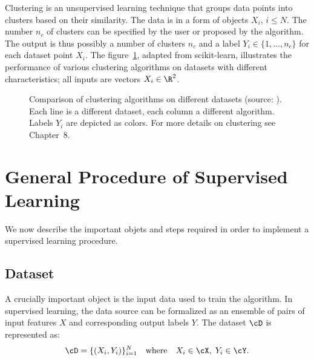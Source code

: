 Clustering is an unsupervised learning technique that groups data points into
clusters based on their similarity. The data is in a form of objects $X_i$, $i \le N$.
The number $n_c$ of clusters can be specified by the user or proposed by the
algorithm. The output is thus possibly a number of clusters $n_c$ and a label
$Y_i \in \{1, \ldots, n_c\}$ for each dataset point $X_i$. The figure~\ref{fig:ch1-clustering}, adapted from scikit-learn,
illustrates the performance of various clustering algorithms on datasets
with different characteristics; all inputs are vectors $X_i \in \R^2$.

\begin{figure}[h]\centering
\caption{Comparison of clustering algorithms on different datasets (source: \cite{turinici14,turinici17}). Each line is a different dataset, each column a different algorithm. Labels $Y_i$ are depicted as colors. For more details on clustering see Chapter~8.}
\label{fig:ch1-clustering}
\end{figure}

\section{General Procedure of Supervised Learning}
\label{sec:ch1-procedure}

We now describe the important objets and steps required in order to implement
a supervised learning procedure.

\subsection{Dataset}
\label{sec:ch1-dataset}

A crucially important object is the input data used to train the algorithm.
In supervised learning, the data source can be formalized as an ensemble of
pairs of input features $X$ and corresponding output labels $Y$. The dataset $\cD$
is represented as:
\begin{equation}\label{eq:ch1-dataset}
\cD = \{(X_i, Y_i)\}_{i=1}^{N} \quad \text{where} \quad X_i \in \cX,\; Y_i \in \cY.
\end{equation}


